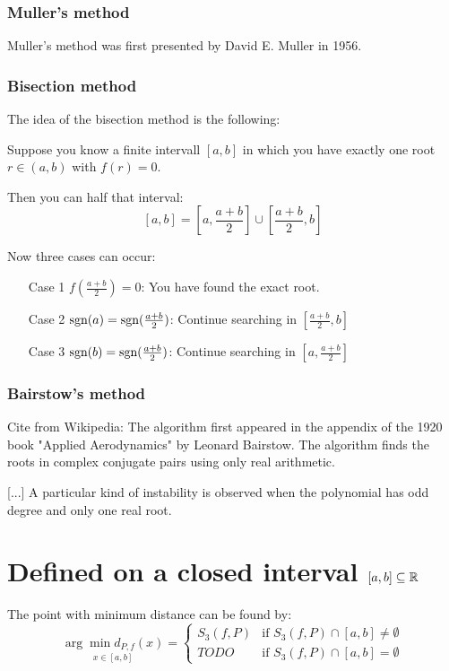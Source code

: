 \subsubsection{Muller's method}
Muller's method was first presented by David E. Muller in 1956.


\subsubsection{Bisection method}
The idea of the bisection method is the following:

Suppose you know a finite intervall $[a,b]$ in which you have 
exactly one root $r \in (a,b)$ with $f(r) = 0$.

Then you can half that interval:
    \[[a, b] = \left [a, \frac{a+b}{2} \right ] \cup \left [\frac{a+b}{2}, b \right ]\]

Now three cases can occur:
\begin{enumerate}
    \item[Case 1] $f(\frac{a+b}{2})=0$: You have found the exact root.
    \item[Case 2] $\text{sgn}(a) = \text{sgn}(\frac{a+b}{2})$: Continue searching in $[\frac{a+b}{2}, b]$
    \item[Case 3] $\text{sgn}(b) = \text{sgn}(\frac{a+b}{2})$: Continue searching in $[a, \frac{a+b}{2}]$
\end{enumerate}


\subsubsection{Bairstow's method}
Cite from Wikipedia:
The algorithm first appeared in the appendix of the 1920 book "Applied Aerodynamics" by Leonard Bairstow. The algorithm finds the roots in complex conjugate pairs using only real arithmetic.

[...]
A particular kind of instability is observed when the polynomial has odd degree and only one real root.



\section{Defined on a closed interval $[a,b] \subseteq \mathbb{R}$}
The point with minimum distance can be found by:
\[\underset{x\in[a,b]}{\arg \min d_{P,f}(x)} = \begin{cases}
 S_3(f, P) &\text{if } S_3(f, P) \cap [a,b] \neq \emptyset\\
  TODO     &\text{if } S_3(f, P) \cap [a,b] = \emptyset
    \end{cases}\]
